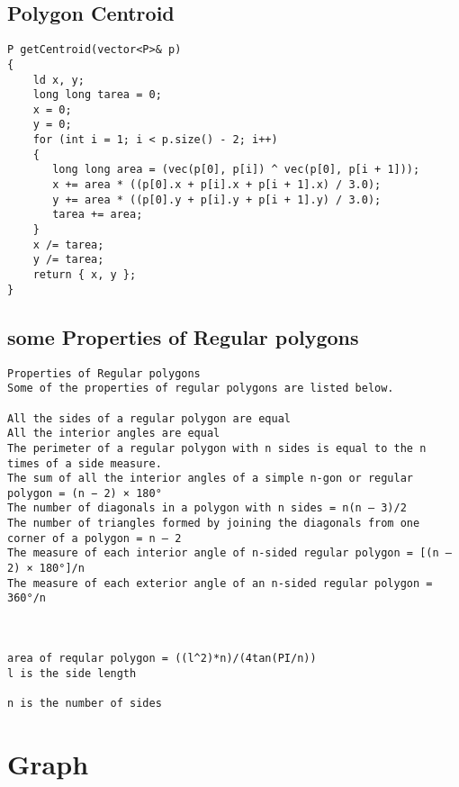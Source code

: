 \documentclass{article}
\begin{document}
\subsection{Polygon Centroid}
\begin{verbatim}
P getCentroid(vector<P>& p)  
{  
    ld x, y;  
    long long tarea = 0;  
    x = 0;  
    y = 0;  
    for (int i = 1; i < p.size() - 2; i++)  
    {  
       long long area = (vec(p[0], p[i]) ^ vec(p[0], p[i + 1]));  
       x += area * ((p[0].x + p[i].x + p[i + 1].x) / 3.0);  
       y += area * ((p[0].y + p[i].y + p[i + 1].y) / 3.0);  
       tarea += area;  
    }  
    x /= tarea;  
    y /= tarea;  
    return { x, y };  
}
\end{verbatim}

\subsection{some Properties of Regular polygons}
\begin{verbatim}
Properties of Regular polygons
Some of the properties of regular polygons are listed below.

All the sides of a regular polygon are equal
All the interior angles are equal
The perimeter of a regular polygon with n sides is equal to the n times of a side measure.
The sum of all the interior angles of a simple n-gon or regular polygon = (n − 2) × 180°
The number of diagonals in a polygon with n sides = n(n – 3)/2
The number of triangles formed by joining the diagonals from one corner of a polygon = n – 2
The measure of each interior angle of n-sided regular polygon = [(n – 2) × 180°]/n
The measure of each exterior angle of an n-sided regular polygon = 360°/n



area of reqular polygon = ((l^2)*n)/(4tan(PI/n))
l is the side length

n is the number of sides\end{verbatim}

\section{Graph}
\end{document}
